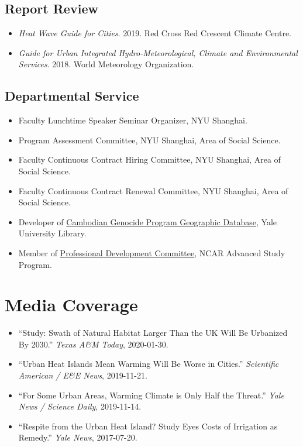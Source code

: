 \documentclass[11pt,letterpaper]{article}
\begin{document}
\subsection{Report Review}
\begin{itemize}
  \item \textit{Heat Wave Guide for Cities}. 2019. Red Cross Red Crescent Climate Centre.
  \item \textit{Guide for Urban Integrated Hydro-Meteorological, Climate and Environmental Services}. 2018. World Meteorology Organization.
\end{itemize}

\subsection{Departmental Service}
\begin{itemize}
  \item Faculty Lunchtime Speaker Seminar Organizer, NYU Shanghai.
  \item Program Assessment Committee, NYU Shanghai, Area of Social Science.
  \item Faculty Continuous Contract Hiring Committee, NYU Shanghai, Area of Social Science.
  \item Faculty Continuous Contract Renewal Committee, NYU Shanghai, Area of Social Science.
  \item Developer of \href{https://gsp.yale.edu/case-studies/cambodian-genocide-program/cambodian-genocide-databases-cgdb/geographic-database-cgeo}{Cambodian Genocide Program Geographic Database}, Yale University Library.
  \item Member of \href{https://asp.ucar.edu/postdocs/ncarucp-postdoc-committees}{Professional Development Committee}, NCAR Advanced Study Program.
\end{itemize}

\section{Media Coverage}
\begin{itemize}
  \item ``Study: Swath of Natural Habitat Larger Than the UK Will Be Urbanized By 2030.'' \textit{Texas A\&M Today}, 2020-01-30.
  \item ``Urban Heat Islands Mean Warming Will Be Worse in Cities.'' \textit{Scientific American / E\&E News}, 2019-11-21.
  \item ``For Some Urban Areas, Warming Climate is Only Half the Threat.'' \textit{Yale News / Science Daily}, 2019-11-14.
  \item ``Respite from the Urban Heat Island? Study Eyes Costs of Irrigation as Remedy.'' \textit{Yale News}, 2017-07-20.
\end{itemize}
\end{document}
